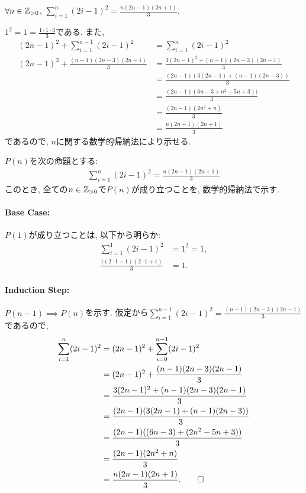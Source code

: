 \begin{prop}
  \label{p:20230706}
  $\forall n\in\mathbb{Z}_{>0}$, $\sum_{i=1}^{n}(2i-1)^2=\frac{n(2n-1)(2n+1)}{3}$.
\end{prop}
\begin{proof**}
  $1^2=1=\frac{1\cdot 1\cdot 3}{3}$である.
  また,
  \begin{align*}
    (2n-1)^2+\sum_{i=1}^{n-1}(2i-1)^2&=\sum_{i=1}^{n}(2i-1)^2\\
    (2n-1)^2+\frac{(n-1)(2n-3)(2n-1)}{3}
    &=\frac{3(2n-1)^2+(n-1)(2n-3)(2n-1)}{3}\\
    &=\frac{(2n-1)(3(2n-1)+(n-1)(2n-3))}{3}\\
    &=\frac{(2n-1)(6n-3+n^2-5n+3))}{3}\\
    &=\frac{(2n-1)(2n^2+n)}{3}\\
    &=\frac{n(2n-1)(2n+1)}{3}
  \end{align*}
  であるので,
  $n$に関する数学的帰納法により示せる.
\end{proof**}
\begin{proof*}
  $P(n)$を次の命題とする:
  \begin{align*}
    \sum_{i=1}^{n}(2i-1)^2=\frac{n(2n-1)(2n+1)}{3}
  \end{align*}
  このとき,
  全ての$n\in\mathbb{Z}_{>0}$で$P(n)$が成り立つことを,
  数学的帰納法で示す.

  \paragraph{Base Case:}
  $P(1)$が成り立つことは, 以下から明らか:
  \begin{align*}
    \sum_{i=1}^{1}(2i-1)^2&=1^2=1,\\
    \frac{1(2\cdot 1-1)(2\cdot 1+1)}{3}&=1.
  \end{align*}

  \paragraph{Induction Step:}
  $P(n-1)\implies P(n)$を示す.
  仮定から$\sum_{i=1}^{n-1}(2i-1)^2=\frac{(n-1)(2n-3)(2n-1)}{3}$であるので,
  \begin{align*}
    \sum_{i=1}^{n}(2i-1)^2&=(2n-1)^2+\sum_{i=0}^{n-1}(2i-1)^2\\
    &=(2n-1)^2+\frac{(n-1)(2n-3)(2n-1)}{3}\\
    &=\frac{3(2n-1)^2+(n-1)(2n-3)(2n-1)}{3}\\
    &=\frac{(2n-1)(3(2n-1)+(n-1)(2n-3))}{3}\\
    &=\frac{(2n-1)((6n-3)+(2n^2-5n+3))}{3}\\
    &=\frac{(2n-1)(2n^2+n)}{3}\\
    &=\frac{n(2n-1)(2n+1)}{3}
    .\qedhere
  \end{align*}
\end{proof*}


